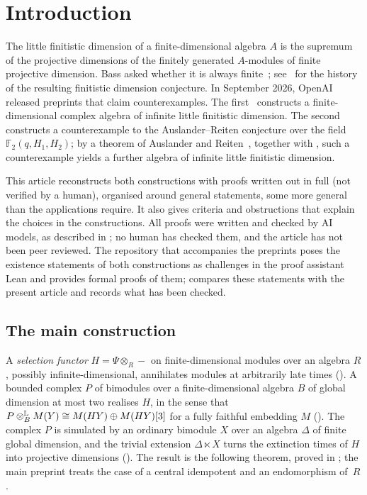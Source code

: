 \section{Introduction}
\label{sec:introduction}

The little finitistic dimension of a finite-dimensional algebra $A$ is the
supremum of the projective dimensions of the finitely generated $A$-modules of
finite projective dimension. Bass asked whether it is always
finite~\cite{Bas60}; see~\cite{ZHui95} for the history of the resulting
finitistic dimension conjecture. In September 2026, OpenAI released preprints
that claim counterexamples. The first~\cite{OAI26findim} constructs a
finite-dimensional complex algebra of infinite little finitistic dimension. The
second~\cite{OAI26ar} constructs a counterexample to the Auslander--Reiten
conjecture over the field $\mathbb{F}_2(q,H_1,H_2)$; by a theorem of Auslander
and Reiten~\cite[Theorem~1.1(b)]{AR75a}, together with
, such a counterexample yields a further
algebra of infinite little finitistic dimension.

This article reconstructs both constructions with proofs written out in full
(not verified by a human), organised
around general statements, some more general than the applications require. It
also gives criteria and obstructions that explain the choices in the
constructions. All proofs were written and checked by AI models, as
described in ; no human has checked
them, and the article has not been peer reviewed. The repository that
accompanies the preprints poses the existence statements of both constructions
as challenges in the proof assistant Lean and provides formal proofs of them;
 compares these statements with the present article and
records what has been checked.

\subsection*{The main construction}

A \emph{selection functor}
${H=\Psi\otimes_R-}$ on finite-dimensional modules over an algebra $R$, possibly
infinite-dimensional, annihilates modules at arbitrarily late times
(). A bounded complex $P$ of bimodules over a
finite-dimensional algebra $B$ of global dimension at most two realises $H$, in
the
sense that ${P\Lotimes[B]M(Y)\cong M(HY)\oplus M(HY)[3]}$ for a fully faithful
embedding $M$ (). The complex $P$ is simulated by an
ordinary bimodule $X$ over an algebra $\Delta$ of finite global dimension, and
the trivial extension ${\Delta\ltimes X}$ turns the extinction times of $H$ into
projective dimensions (). The result is
the following theorem, proved in ; the main preprint
treats the case of a central idempotent and an endomorphism of~$R$.

